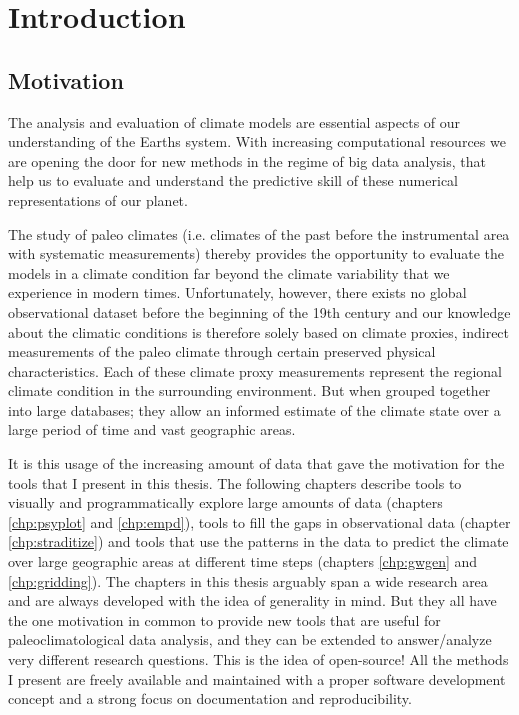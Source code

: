 
\chapter{Introduction}

\label{chp:intro}

\begin{refsection}


\section{Motivation} \label{sec:motivation}
The analysis and evaluation of climate models are essential aspects of our understanding of the Earths system. With increasing computational resources we are opening the door for new methods in the regime of big data analysis, that help us to evaluate and understand the predictive skill of these numerical representations of our planet.

The study of paleo climates (i.e. climates of the past before the instrumental area with systematic measurements) thereby provides the opportunity to evaluate the models in a climate condition far beyond the climate variability that we experience in modern times. Unfortunately, however, there exists no global observational dataset before the beginning of the 19th century and our knowledge about the climatic conditions is therefore solely based on climate proxies, indirect measurements of the paleo climate through certain preserved physical characteristics. Each of these climate proxy measurements represent the regional climate condition in the surrounding environment. But when grouped together into large databases; they allow an informed estimate of the climate state over a large period of time and vast geographic areas.

It is this usage of the increasing amount of data that gave the motivation for the tools that I present in this thesis. The following chapters describe tools to visually and programmatically explore large amounts of data (chapters \ref{chp:psyplot} and \ref{chp:empd}), tools to fill the gaps in observational data (chapter \ref{chp:straditize}) and tools that use the patterns in the data to predict the climate over large geographic areas at different time steps (chapters \ref{chp:gwgen} and \ref{chp:gridding}). The chapters in this thesis arguably span a wide research area and are always developed with the idea of generality in mind. But they all have the one motivation in common to provide new tools that are useful for paleoclimatological data analysis, and they can be extended to answer/analyze very different research questions. This is the idea of open-source! All the methods I present are freely available and maintained with a proper software development concept and a strong focus on documentation and reproducibility.


\end{refsection}
